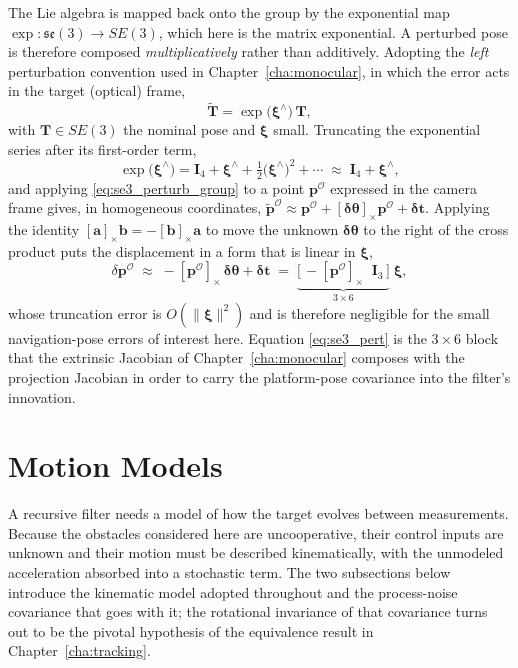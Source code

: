 The Lie algebra is mapped back onto the group by the exponential map
$\exp:\mathfrak{se}(3)\to SE(3)$, which here is the matrix exponential.
A perturbed pose is therefore composed \emph{multiplicatively} rather than
additively. Adopting the \emph{left} perturbation convention used in
Chapter~\ref{cha:monocular}, in which the error acts in the target (optical)
frame,
\begin{equation}
  \tilde{\bm{T}} = \exp\!\big(\bm{\xi}^{\wedge}\big)\,\bm{T},
  \label{eq:se3_perturb_group}
\end{equation}
with $\bm{T}\in SE(3)$ the nominal pose and $\bm{\xi}$ small. Truncating the
exponential series after its first-order term,
\begin{equation}
  \exp\!\big(\bm{\xi}^{\wedge}\big)
  = \bm{I}_4 + \bm{\xi}^{\wedge} + \tfrac{1}{2}\big(\bm{\xi}^{\wedge}\big)^{2} + \cdots
  \;\approx\; \bm{I}_4 + \bm{\xi}^{\wedge},
  \label{eq:se3_exp_approx}
\end{equation}
and applying \eqref{eq:se3_perturb_group} to a point $\bm{p}^{\mathcal{O}}$
expressed in the camera frame gives, in homogeneous coordinates,
$\tilde{\bm{p}}^{\mathcal{O}} \approx \bm{p}^{\mathcal{O}}
 + [\bm{\delta\theta}]_\times\bm{p}^{\mathcal{O}} + \bm{\delta t}$.
Applying the identity $[\bm{a}]_\times\bm{b}=-[\bm{b}]_\times\bm{a}$ to move the
unknown $\bm{\delta\theta}$ to the right of the cross product puts the
displacement in a form that is linear in $\bm{\xi}$,
\begin{equation}
  \delta\bm{p}^{\mathcal{O}} \;\approx\; -[\bm{p}^{\mathcal{O}}]_\times\,\bm{\delta\theta} + \bm{\delta t}
  \;=\; \underbrace{\big[\,-[\bm{p}^{\mathcal{O}}]_\times \;\; \bm{I}_3\,\big]}_{3\times 6}\;\bm{\xi},
  \label{eq:se3_pert}
\end{equation}
whose truncation error is $O(\lVert\bm{\xi}\rVert^{2})$ and is therefore
negligible for the small navigation-pose errors of interest here. Equation
\eqref{eq:se3_pert} is the $3\times6$ block that the extrinsic Jacobian of
Chapter~\ref{cha:monocular} composes with the projection Jacobian in order to
carry the platform-pose covariance into the filter's innovation.

\section{Motion Models}

A recursive filter needs a model of how the target evolves between measurements.
Because the obstacles considered here are uncooperative, their control inputs are
unknown and their motion must be described kinematically, with the unmodeled
acceleration absorbed into a stochastic term. The two subsections below introduce
the kinematic model adopted throughout and the process-noise covariance that goes
with it; the rotational invariance of that covariance turns out to be the pivotal
hypothesis of the equivalence result in Chapter~\ref{cha:tracking}.

